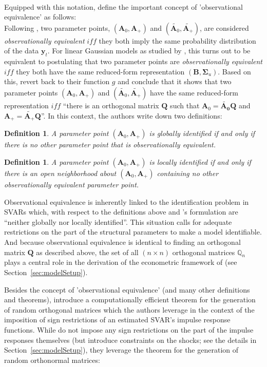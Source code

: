 \documentclass[a4paper,11pt,listof=nochaptergap,oneside,pointednumbers,bibtotoc,bigheadings,liststotoc,hidelinks]{scrbook}
\theoremstyle{mysatz}
\theoremstyle{mydefinition}
\newtheorem{defi}[satz]{Definition}
\theoremstyle{mytheorem}
\theoremstyle{mybemerkung}
\newcommand{\vect}[1]{\boldsymbol{\mathbf{#1}}}
\begin{document}
\\
Equipped with this notation, \citet{rubioetal:10} define the important concept of 'observational equivalence' as follows: \\
Following \citet{rothenberg:71}, two parameter points, $(\vect{A}_0, \vect{A}_+)$ and $(\widetilde{\vect{A}_0}, \widetilde{\vect{A}_+})$, are considered \textit{observationally equivalent} $iff$ they both imply the same probability distribution of the data $\vect{y}_t$. For linear Gaussian models as studied by \citet{rubioetal:10}, this turns out to be equivalent to postulating that two parameter points are \textit{observationally equivalent} $iff$ they both have the same reduced-form representation $(\vect{B}, \vect{\Sigma}_u)$. Based on this, \citet{rubioetal:10} revert back to their function $g$ and conclude that it shows that two parameter points $(\vect{A}_0, \vect{A}_+)$ and $(\widetilde{\vect{A}_0}, \widetilde{\vect{A}_+})$ have the same reduced-form representation $iff$ ``there is an orthogonal matrix $\vect{Q}$ such that $\vect{A}_0 = \vect{\widetilde{\vect{A}_0}}\vect{Q}$ and $\vect{A}_+ = \widetilde{\vect{A}_+} \vect{Q}$''. In this context, the authors write down two definitions:
\begin{defi}
A parameter point $(\vect{A}_0, \vect{A}_+)$ is globally identified if and only if there is no other parameter point that is observationally equivalent.
\end{defi}
\begin{defi}
A parameter point $(\vect{A}_0, \vect{A}_+)$ is locally identified if and only if there is an open neighborhood about $(\vect{A}_0, \vect{A}_+)$ containing no other observationally equivalent parameter point.
\end{defi}

Observational equivalence is inherently linked to the identification problem in SVARs which, with respect to the definitions above and \citet{rubioetal:10}'s formulation are ``neither globally nor locally identified''. This situation calls for adequate restrictions on the part of the structural parameters to make a model identifiable. And because observational equivalence is identical to finding an orthogonal matrix $\vect{Q}$ as described above, the set of all $(n \times n)$ orthogonal matrices $\mathbb{Q}_n$ plays a central role in the derivation of the econometric framework of \citet{ludvigsonetal:18} (see Section~\ref{sec:modelSetup}).
	
Besides the concept of 'observational equivalence' (and many other definitions and theorems), \citet{rubioetal:10} introduce a computationally efficient theorem for the generation of random orthogonal matrices which the authors leverage in the context of the imposition of sign restrictions of an estimated SVAR's impulse response functions. While \citet{ludvigsonetal:18} do not impose any sign restrictions on the part of the impulse responses themselves (but introduce constraints on the shocks; see the details in Section~\ref{sec:modelSetup}), they leverage the theorem for the generation of random orthonormal matrices:
\end{document}
